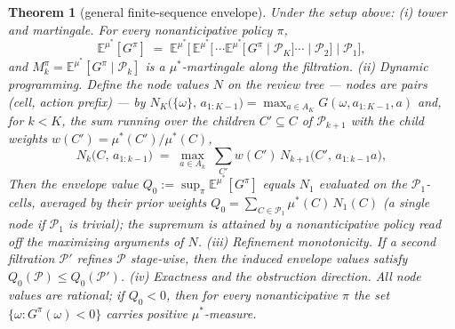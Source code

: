 \documentclass[10pt,twocolumn]{article}
\theoremstyle{plain}
\newtheorem{theorem}{Theorem}
\theoremstyle{definition}
\theoremstyle{remark}
\begin{document}
\begin{theorem}[general finite-sequence envelope]\label{dual-thm:general}
Under the setup above: \emph{(i) tower and martingale.} For every
nonanticipative policy $\pi$,
\[
\mathbb{E}^{\mu^{*}}[G^{\pi}] \;=\;
\mathbb{E}^{\mu^{*}}\bigl[\, \mathbb{E}^{\mu^{*}}\bigl[\, \cdots
\mathbb{E}^{\mu^{*}}[\, G^{\pi} \mid \mathcal{P}_{K} \bigr] \cdots
\mid \mathcal{P}_{2} \bigr] \mid \mathcal{P}_{1} \bigr],
\]
and $M^{\pi}_{k} = \mathbb{E}^{\mu^{*}}[G^{\pi} \mid
\mathcal{P}_{k}]$ is a $\mu^{*}$-martingale along the filtration.
\emph{(ii) Dynamic programming.} Define the node values $N$ on the
review tree --- nodes are pairs (cell, action prefix) --- by
$N_{K}\bigl(\{\omega\},\, a_{1:K-1}\bigr) = \max_{a \in A_{K}}
G(\omega, a_{1:K-1}, a)$ and, for $k < K$, the sum running over the
children $C' \subseteq C$ of $\mathcal{P}_{k+1}$ with the child weights
$w(C') = \mu^{*}(C')/\mu^{*}(C)$,
\[
N_{k}\bigl(C,\, a_{1:k-1}\bigr)
\;=\; \max_{a \in A_{k}} \;
\sum_{C'} w(C')\, N_{k+1}\bigl(C',\, a_{1:k-1}a\bigr),
\]
Then the envelope value $Q_{0} := \sup_{\pi}
\mathbb{E}^{\mu^{*}}[G^{\pi}]$ equals $N_{1}$ evaluated on the
$\mathcal{P}_{1}$-cells, averaged by their prior weights
$Q_{0} = \sum_{C \in \mathcal{P}_{1}} \mu^{*}(C)\,
N_{1}(C)$ (a single node if $\mathcal{P}_{1}$ is trivial); the supremum
is attained by a nonanticipative policy read off the maximizing
arguments of $N$. \emph{(iii) Refinement monotonicity.} If a second
filtration $\mathcal{P}'$ refines $\mathcal{P}$ stage-wise, then the
induced envelope values satisfy $Q_{0}(\mathcal{P}) \le
Q_{0}(\mathcal{P}')$. \emph{(iv) Exactness and the obstruction
direction.} All node values are rational; if $Q_{0} < 0$, then for
\emph{every} nonanticipative $\pi$ the set
$\{\omega: G^{\pi}(\omega) < 0\}$ carries positive $\mu^{*}$-measure.
\end{theorem}
\end{document}
